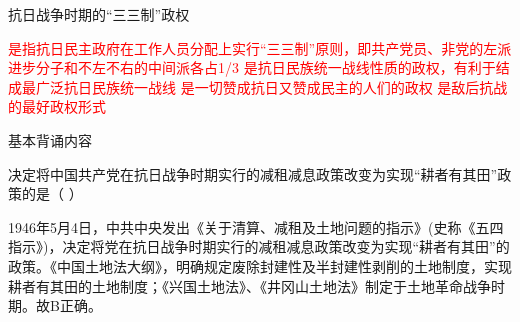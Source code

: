 \question 抗日战争时期的``三三制''政权
\par\fourch
{\textcolor{red}{是指抗日民主政府在工作人员分配上实行“三三制”原则，即共产党员、非党的左派进步分子和不左不右的中间派各占1/3}}
{\textcolor{red}{是抗日民族统一战线性质的政权，有利于结成最广泛抗日民族统一战线}}
{\textcolor{red}{是一切赞成抗日又赞成民主的人们的政权}}
{\textcolor{red}{是敌后抗战的最好政权形式}}
\begin{solution}基本背诵内容
\end{solution}
\question 决定将中国共产党在抗日战争时期实行的减租减息政策改变为实现``耕者有其田''政策的是（
）
\par{}
\begin{solution}1946年5月4日，中共中央发出《关于清算、减租及土地问题的指示》(史称《五四指示》)，决定将党在抗日战争时期实行的减租减息政策改变为实现``耕者有其田''的政策。《中国土地法大纲》，明确规定废除封建性及半封建性剥削的土地制度，实现耕者有其田的土地制度；《兴国土地法》、《井冈山土地法》制定于土地革命战争时期。故B正确。
\end{solution}
